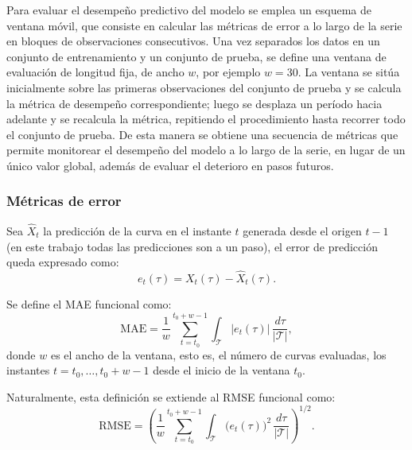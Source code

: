 Para evaluar el desempeño predictivo del modelo se emplea un esquema de ventana móvil, que consiste en calcular las métricas de error a lo largo de la serie en bloques de observaciones consecutivos. Una vez separados los datos en un conjunto de entrenamiento y un conjunto de prueba, se define una ventana de evaluación de longitud fija, de ancho $w$, por ejemplo $w = 30$. La ventana se sitúa inicialmente sobre las primeras observaciones del conjunto de prueba y se calcula la métrica de desempeño correspondiente; luego se desplaza un período hacia adelante y se recalcula la métrica, repitiendo el procedimiento hasta recorrer todo el conjunto de prueba. De esta manera se obtiene una secuencia de métricas que permite monitorear el desempeño del modelo a lo largo de la serie, en lugar de un único valor global, además de evaluar el deterioro en pasos futuros.

\subsubsection{Métricas de error}
\label{02_02_03_02_metricas_error}

Sea $\widehat{X}_{t}$ la predicción de la curva en el instante $t$ generada desde el origen $t-1$ (en este trabajo todas las predicciones son a un paso), el error de predicción queda expresado como:
\begin{equation}
    e_{t}(\tau) = X_{t}(\tau) - \widehat{X}_{t}(\tau).
\end{equation}

Se define el MAE funcional como:
\begin{equation}
    \mathrm{MAE} = \frac{1}{w}\sum_{t=t_0}^{t_0+w-1}
    \int_{\mathcal{T}} \bigl|e_{t}(\tau)\bigr| \, \frac{d\tau}{|\mathcal{T}|},
\end{equation}
donde $w$ es el ancho de la ventana, esto es, el número de curvas evaluadas, los instantes $t = t_0, \dots, t_0+w-1$ desde el inicio de la ventana $t_0$.

Naturalmente, esta definición se extiende al RMSE funcional como:
\begin{equation}
    \mathrm{RMSE} = \left(\frac{1}{w}\sum_{t=t_0}^{t_0+w-1}
    \int_{\mathcal{T}} \bigl(e_{t}(\tau)\bigr)^2 \, \frac{d\tau}{|\mathcal{T}|}
    \right)^{1/2}.
\end{equation}

